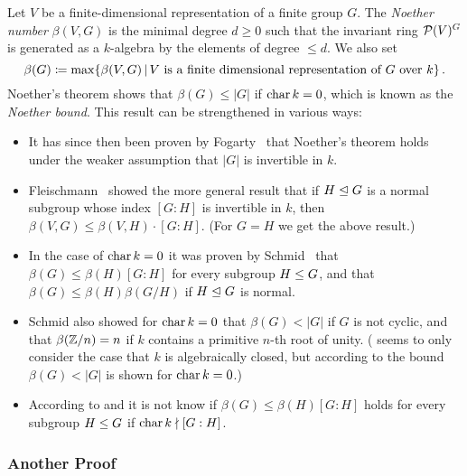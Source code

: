 \begin{remark}
  \label{remark: Noether bound}
  Let $V$ be a finite-dimensional representation of a finite group $G$.
  The \emph{Noether number} $\beta(V,G)$ is the minimal degree $d \geq 0$ such that the invariant ring $\mathcal{P}(V)^G$ is generated as a $k$-algebra by the elements of degree $\leq d$.
  We also set
  \[
              \beta(G)
    \defined  \max  \{
                      \beta(V,G)
                    \suchthat
                      \text{$V$ is a finite dimensional representation of $G$ over $k$}
                    \} \,.
  \]
  Noether’s theorem shows that $\beta(G) \leq |G|$ if $\operatorname{char} k = 0$, which is known as the \emph{Noether bound}.
  This result can be strengthened in various ways:
  \begin{itemize}
    \item
      It has since then been proven by Fogarty~\cite{Fogarty2001} that Noether’s theorem holds under the weaker assumption that $|G|$ is invertible in $k$.
    \item
      Fleischmann~\cite{Fleischmann2000} showed the more general result that if $H \trianglelefteq G$ is a normal subgroup whose index $[G : H]$ is invertible in $k$, then $\beta(V,G) \leq \beta(V,H) \cdot [G : H]$.
      (For $G = H$ we get the above result.)
    \item
      In the case of $\operatorname{char}{k} = 0$ it was proven by Schmid~\cite{Schmid1991} that $\beta(G) \leq \beta(H)[G : H]$ for every subgroup $H \leq G$, and that $\beta(G) \leq \beta(H)\beta(G/H)$ if $H \trianglelefteq G$ is normal.
    \item
      Schmid also showed for $\operatorname{char} k = 0$ that $\beta(G) < |G|$ if $G$ is not cyclic, and that $\beta(\mathbb{Z}/n) = n$ if $k$ contains a primitive $n$-th root of unity.
      (\cite{Schmid1991} seems to only consider the case that $k$ is algebraically closed, but according to \cite[Theorem~3.7]{Wehlau2006} the bound $\beta(G) < |G|$ is shown for $\operatorname{char} k = 0$.)
    \item
      According to \cite[Remark 3.6]{Wehlau2006} and \cite[Remark~3.2.5]{Derksen2015} it is not know if $\beta(G) \leq \beta(H)[G : H]$ holds for every subgroup $H \leq G$ if $\operatorname{char} k \nmid [G : H]$. 
  \end{itemize}
\end{remark}



\subsubsection*{Another Proof}



